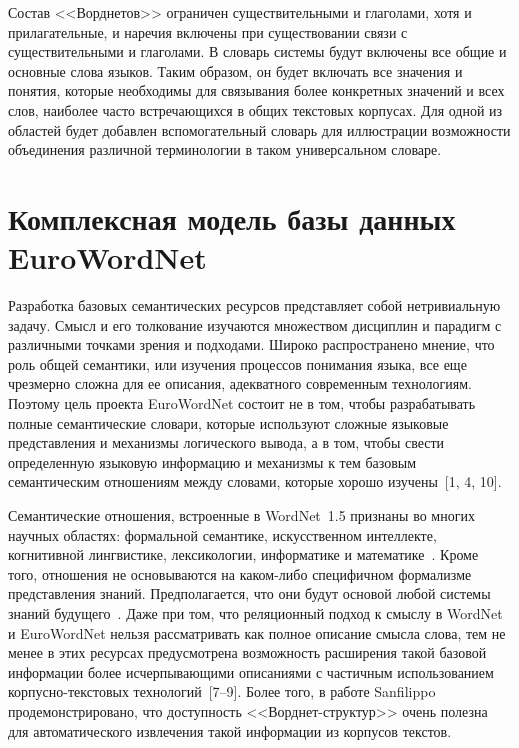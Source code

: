 \begin{multicols}{2}
     Состав <<Ворднетов>> ограничен существительными и глаголами, хотя 
и прилагательные, и наре\-чия включены при существовании связи с 
существительными и глаголами. В словарь системы %
 \mbox{будут} включены все 
общие и основные слова языков. Таким образом, он будет включать все значения и 
понятия, которые необходимы для связывания более конкретных значений и 
всех слов, наиболее часто встречающихся в общих текстовых кор\-пу\-сах. 
Для одной из областей будет добавлен вспомогательный словарь для 
иллюстрации возможности объединения различной терминологии в таком 
универсальном словаре.
     
\vspace*{-3pt}
\section{Комплексная модель базы данных EuroWordNet}
\vspace*{-2pt}
     
     Разработка базовых семантических ресурсов представляет собой 
нетривиальную задачу. Смысл и его толкование изучаются множеством 
дис\-цип\-лин и парадигм с различными точками зрения и подходами. Широко 
распространено мнение, что роль общей семантики, или изучения процессов 
понимания языка, все еще чрезмерно сложна для ее описания, адекватного 
современным технологиям. Поэтому цель проекта EuroWordNet состоит не  в 
том, чтобы разрабатывать полные семантические словари, которые используют 
сложные языковые представления и механизмы логического вывода, а в том, 
чтобы свести определенную языковую информацию и механизмы к тем 
базовым семантическим отношениям между словами, которые хорошо 
изучены~[1, 4, 10].
     
Семантические отношения, встроенные в WordNet~1.5 признаны во 
многих научных областях: формальной семантике, искусственном интеллекте, %
когни\-тив\-ной лингвистике, лексикологии, информатике и 
математике~\cite{1koz}. Кроме того, отношения не основываются на 
     ка\-ком-ли\-бо специфичном формализме представления знаний. 
Предполагается, что они будут основой любой системы знаний 
будущего~\cite{4koz}. Даже при том, что реляционный подход к смыслу в 
WordNet  и EuroWordNet нельзя рас\-смат\-ри\-вать как полное описание смысла 
слова, тем не менее в этих ресурсах предусмотрена возможность расширения 
такой базовой информации более исчерпывающими описаниями с частичным %
использованием кор\-пус\-но-текс\-то\-вых технологий~[7--9]. Более того, в работе 
Sanfilippo~\cite{11koz} продемонстрировано, что доступность 
     <<Ворд\-нет-струк\-тур>> очень полезна для автоматического извлечения 
такой информации из корпусов текстов.
     

\end{multicols}
